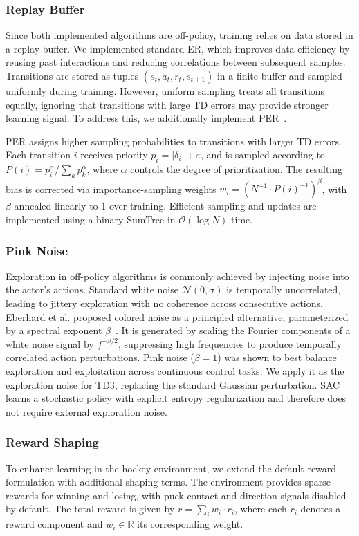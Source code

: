 \subsubsection*{Replay Buffer}
Since both implemented algorithms are off-policy, training relies on data stored in a replay buffer. 
We implemented standard \ac{ER}, which improves data efficiency by reusing past interactions and 
reducing correlations between subsequent samples. 
Transitions are stored as tuples $(s_t, a_t, r_t, s_{t+1})$ in a finite buffer and sampled uniformly during training. 
However, uniform sampling treats all transitions equally, ignoring that transitions with 
large \ac{TD} errors may provide stronger learning signal. 
To address this, we additionally implement \ac{PER}~\cite{Schaul2015PrioritizedER}.

\medskip
\ac{PER} assigns higher sampling probabilities to transitions with larger \ac{TD} errors. 
Each transition $i$ receives priority $p_i = |\delta_i| + \varepsilon$, and is sampled according to $P(i) = p_i^\alpha / \sum_k p_k^\alpha$, where $\alpha$ controls the degree of prioritization. 
The resulting bias is corrected via importance-sampling weights $w_i = (N^{-1} \cdot P(i)^{-1})^\beta$, with $\beta$ annealed linearly to $1$ over training. 
Efficient sampling and updates are implemented using a binary SumTree in $\mathcal{O}(\log N)$ time.

\subsubsection*{Pink Noise}
Exploration in off-policy algorithms is commonly achieved by injecting noise into the actor's actions. 
Standard white noise $\mathcal{N}(0, \sigma)$ is temporally uncorrelated, leading to jittery exploration with no coherence across consecutive actions. 
Eberhard et al. proposed colored noise as a principled alternative, parameterized by a spectral exponent $\beta$~\cite{eberhard2023pink}. 
It is generated by scaling the Fourier components of a white noise signal by $f^{-\beta/2}$, suppressing high frequencies to produce temporally correlated action perturbations. 
Pink noise ($\beta = 1$) was shown to best balance exploration and exploitation across continuous control tasks. 
We apply it as the exploration noise for \ac{TD3}, replacing the standard Gaussian perturbation. \ac{SAC} learns a stochastic policy with explicit entropy regularization and therefore does not require external exploration noise.

\subsubsection*{Reward Shaping}
To enhance learning in the hockey environment, we extend the default reward formulation with additional shaping terms. 
The environment provides sparse rewards for winning and losing, with puck contact and direction signals disabled by default. 
The total reward is given by $r = \sum_{i} w_i \cdot r_i$, where each $r_i$ denotes a reward component and $w_i \in \mathbb{R}$ its corresponding weight.

